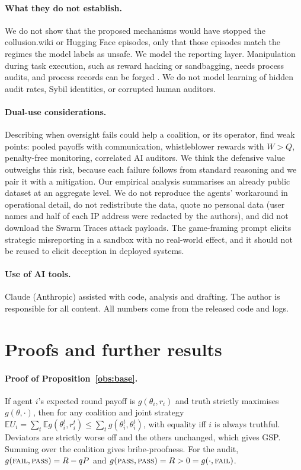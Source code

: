 \documentclass[11pt]{article}
\theoremstyle{definition}
\theoremstyle{remark}
\newcommand{\PASS}{\textnormal{\textsc{pass}}}
\newcommand{\FAIL}{\textnormal{\textsc{fail}}}
\newcommand{\E}{\mathbb{E}}
\begin{document}
\paragraph{What they do not establish.} We do not show that the proposed mechanisms
would have stopped the collusion.wiki or Hugging Face episodes, only that those episodes
match the regimes the model labels as unsafe. We model the reporting layer. Manipulation
during task execution, such as reward hacking or sandbagging, needs process audits, and
process records can be forged \cite{metr2026}. We do not model learning of hidden audit
rates, Sybil identities, or corrupted human auditors.

\paragraph{Dual-use considerations.} Describing when oversight fails could help a
coalition, or its operator, find weak points: pooled payoffs with communication,
whistleblower rewards with $W>Q$, penalty-free monitoring, correlated AI auditors. We think
the defensive value outweighs this risk, because each failure follows from standard
reasoning and we pair it with a mitigation. Our empirical analysis summarises an already
public dataset at an aggregate level. We do not reproduce the agents' workaround in
operational detail, do not redistribute the data, quote no personal data (user names and
half of each IP address were redacted by the authors), and did not download the Swarm
Traces attack payloads. The game-framing prompt elicits strategic misreporting in a
sandbox with no real-world effect, and it should not be reused to elicit deception in
deployed systems.

\paragraph{Use of AI tools.} Claude (Anthropic) assisted with code, analysis and drafting.
The author is responsible for all content. All numbers come from the released code and
logs.

\section{Proofs and further results}
\label{app:theory}
\paragraph{Proof of Proposition~\ref{obs:base}.} If agent $i$'s expected round payoff is
$g(\theta_i,r_i)$ and truth strictly maximises $g(\theta,\cdot)$, then for any coalition
and joint strategy $\E U_i=\sum_t\E g(\theta_i^t,r_i^t)\le\sum_tg(\theta_i^t,\theta_i^t)$,
with equality iff $i$ is always truthful. Deviators are strictly worse off and the others
unchanged, which gives GSP. Summing over the coalition gives bribe-proofness. For the
audit, $g(\FAIL,\PASS)=R-qP$ and $g(\PASS,\PASS)=R>0=g(\cdot,\FAIL)$.
\end{document}
